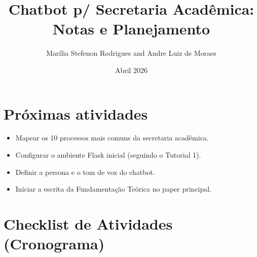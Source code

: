 \documentclass[12pt,a4paper]{article}
\title{Chatbot p/ Secretaria Acadêmica: Notas e Planejamento}
\author{Marília Stefenon Rodrigues and Andre Luiz de Moraes}
\date{Abril 2026}
\begin{document}
\maketitle

\tableofcontents


\section{Próximas atividades}

\begin{boxAvisos}
    \begin{itemize}
        \item Mapear os 10 processos mais comuns da secretaria acadêmica.
        \item Configurar o ambiente Flask inicial (seguindo o Tutorial 1).
        \item Definir a persona e o tom de voz do chatbot.
        \item Iniciar a escrita da Fundamentação Teórica no paper principal.
    \end{itemize}
\end{boxAvisos}

 \section{Checklist de Atividades (Cronograma)}
    
\end{document}

